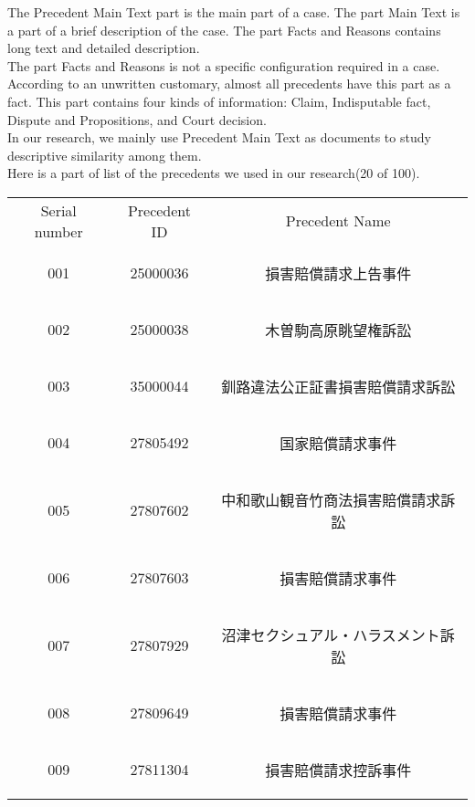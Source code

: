 The Precedent Main Text part is the main part of a case. The part Main Text is a part of a brief description of the case. The part Facts and Reasons contains long text and detailed description.\\
The part Facts and Reasons is not a specific configuration required in a case. According to an unwritten customary, almost all precedents have this part as a fact. This part contains four kinds of information: Claim, Indisputable fact, Dispute and Propositions, and Court decision.\\
In our research, we mainly use Precedent Main Text as documents to study descriptive similarity among them.\\
Here is a part of list of the precedents we used in our research(20 of 100).\\
\newpage
\begin{table}[!h]
\centering
\begin{tabular}{ccc}
\hline
Serial number&Precedent ID&Precedent Name\\
001&25000036&\begin{CJK}{UTF8}{ipxm}損害賠償請求上告事件\end{CJK}\\
002&25000038&\begin{CJK}{UTF8}{ipxm}木曽駒高原眺望権訴訟\end{CJK}\\
003&35000044&\begin{CJK}{UTF8}{ipxm}釧路違法公正証書損害賠償請求訴訟\end{CJK}\\
004&27805492&\begin{CJK}{UTF8}{ipxm}国家賠償請求事件\end{CJK}\\
005&27807602&\begin{CJK}{UTF8}{ipxm}中和歌山観音竹商法損害賠償請求訴訟\end{CJK}\\
006&27807603&\begin{CJK}{UTF8}{ipxm}損害賠償請求事件\end{CJK}\\
007&27807929&\begin{CJK}{UTF8}{ipxm}沼津セクシュアル・ハラスメント訴訟\end{CJK}\\
008&27809649&\begin{CJK}{UTF8}{ipxm}損害賠償請求事件\end{CJK}\\
009&27811304&\begin{CJK}{UTF8}{ipxm}損害賠償請求控訴事件\end{CJK}\\

\end{tabular}
\end{table}
